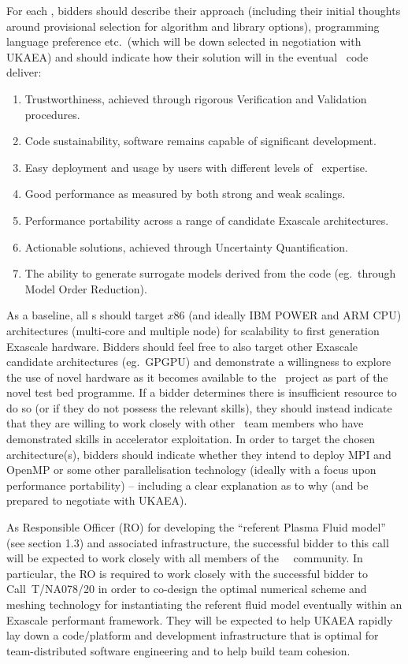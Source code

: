 For each \Papp, bidders should describe their approach (including their initial 
thoughts around provisional selection for algorithm and library options), programming 
language preference etc.\ (which will be down selected in negotiation with UKAEA) 
and should indicate how their solution will in the eventual \nep \   code deliver: 

\begin{enumerate}
\item Trustworthiness, achieved through rigorous Verification and Validation procedures. 
\item Code sustainability, software remains capable of significant development. 
\item Easy deployment and usage by users with different levels of \nep \ expertise.
\item Good performance as measured by both strong and weak scalings. 
\item Performance portability across a range of candidate Exascale architectures. 
\item Actionable solutions, achieved through Uncertainty Quantification.
\item The ability to generate surrogate models derived from the code (eg.\ through 
Model Order Reduction).
\end{enumerate}

As a baseline, all \Papp s should target $x86$ (and ideally IBM POWER and ARM CPU) 
architectures (multi-core and multiple node) for scalability to first generation 
Exascale hardware. Bidders should feel free to also target other Exascale candidate 
architectures (eg.\ GPGPU) and demonstrate a willingness to explore the use of 
novel hardware as it becomes available to the \exc \   project as part of the 
novel test bed programme. If a bidder determines there is insufficient resource 
to do so (or if they do not possess the relevant skills), they should instead indicate 
that they are willing to work closely with other \nep \   team members who have 
demonstrated skills in accelerator exploitation. In order to target the chosen 
architecture(s), bidders should indicate whether they intend to deploy MPI and 
OpenMP or some other parallelisation technology (ideally with a focus upon
performance portability) -- including a clear explanation as to why
(and be prepared to negotiate with UKAEA).

As Responsible Officer (RO) for developing the ``referent Plasma Fluid model'' 
(see section 1.3) and associated infrastructure, the successful bidder to this 
call will be expected to work closely with all members of the \exc \   \nep \   
community.  In particular, the RO is required to work closely 
with the successful bidder to Call~T/NA078/20 in order to co-design the optimal numerical 
scheme and meshing technology for instantiating the referent fluid model eventually 
within an Exascale performant framework. They will be expected to help UKAEA rapidly 
lay down a code/platform and development infrastructure that is optimal for team-distributed 
software engineering and to help build team cohesion. 

